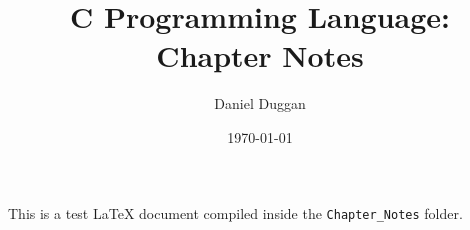 \documentclass{article}
\title{C Programming Language: Chapter Notes}
\author{Daniel Duggan}
\date{\today}
\begin{document}
\maketitle

This is a test LaTeX document compiled inside the \texttt{Chapter\_Notes} folder.
\end{document}
